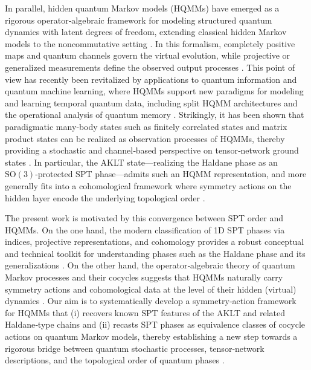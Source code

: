 \documentclass[12pt,a4paper]{article}
\begin{document}
In parallel, hidden quantum Markov models (HQMMs) have emerged as a rigorous operator‑algebraic framework for modeling structured quantum dynamics with latent degrees of freedom, extending classical hidden Markov models to the noncommutative setting \cite{AGLS24Q,AGLS24C}. In this formalism, completely positive maps and quantum channels govern the virtual evolution, while projective or generalized measurements define the observed output processes \cite{choi1975completely,OP87,Partha12}. This point of view has recently been revitalized by applications to quantum information and quantum machine learning, where HQMMs support new paradigms for modeling and learning temporal quantum data, including split HQMM architectures and the operational analysis of quantum memory \cite{ET,LiXi24,Vo25}. Strikingly, it has been shown that paradigmatic many‑body states such as finitely correlated states and matrix product states can be realized as observation processes of HQMMs, thereby providing a stochastic and channel‑based perspective on tensor‑network ground states \cite{fannes1992finitely,fannes2,SouAndhqmm2025}. In particular, the AKLT state—realizing the Haldane phase as an \(\mathrm{SO}(3)\)-protected SPT phase—admits such an HQMM representation, and more generally fits into a cohomological framework where symmetry actions on the hidden layer encode the underlying topological order \cite{AKLT1987,Affleck1988,SouAndhqmm2025,Ragone24}.  

The present work is motivated by this convergence between SPT order and HQMMs. On the one hand, the modern classification of 1D SPT phases via indices, projective representations, and cohomology provides a robust conceptual and technical toolkit for understanding phases such as the Haldane phase and its generalizations \cite{O21,O23,Tas23,Xi18}. On the other hand, the operator‑algebraic theory of quantum Markov processes and their cocycles suggests that HQMMs naturally carry symmetry actions and cohomological data at the level of their hidden (virtual) dynamics \cite{AGLS24Q,AGLS24C,Soza19,Vo25}. Our aim is to systematically develop a symmetry‑action framework for HQMMs that (i) recovers known SPT features of the AKLT and related Haldane‑type chains and (ii) recasts SPT phases as equivalence classes of cocycle actions on quantum Markov models, thereby establishing a new step towards a rigorous bridge between quantum stochastic processes, tensor‑network descriptions, and the topological order of quantum phases \cite{Chen2011a,Chen2011b,D17,SouBarhqmm2026,SouAndhqmm2025}.
\end{document}

